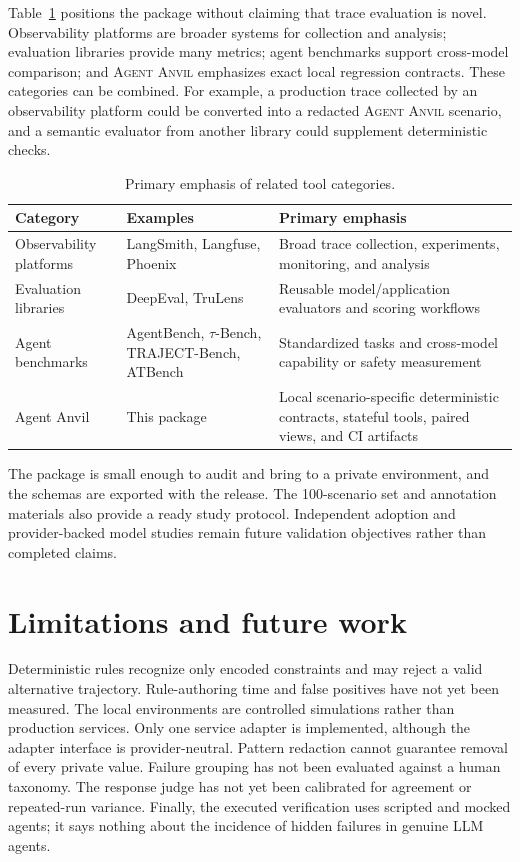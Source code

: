 \documentclass[preprint,12pt]{elsarticle}
\newcommand{\system}{\textsc{Agent Anvil}}
\begin{document}
Table~\ref{tab:positioning} positions the package without claiming that trace evaluation is novel. Observability platforms are broader systems for collection and analysis; evaluation libraries provide many metrics; agent benchmarks support cross-model comparison; and \system{} emphasizes exact local regression contracts. These categories can be combined. For example, a production trace collected by an observability platform could be converted into a redacted \system{} scenario, and a semantic evaluator from another library could supplement deterministic checks.

\begin{table}[ht]
\centering
\caption{Primary emphasis of related tool categories.}
\label{tab:positioning}
\small
\begin{tabular}{@{}p{}p{}p{}@{}}
\toprule
\textbf{Category} & \textbf{Examples} & \textbf{Primary emphasis} \\
\midrule
Observability platforms & LangSmith, Langfuse, Phoenix & Broad trace collection, experiments, monitoring, and analysis \\
Evaluation libraries & DeepEval, TruLens & Reusable model/application evaluators and scoring workflows \\
Agent benchmarks & AgentBench, $\tau$-Bench, TRAJECT-Bench, ATBench & Standardized tasks and cross-model capability or safety measurement \\
Agent Anvil & This package & Local scenario-specific deterministic contracts, stateful tools, paired views, and CI artifacts \\
\bottomrule
\end{tabular}
\end{table}

The package is small enough to audit and bring to a private environment, and the schemas are exported with the release. The 100-scenario set and annotation materials also provide a ready study protocol. Independent adoption and provider-backed model studies remain future validation objectives rather than completed claims.

\section{Limitations and future work}

Deterministic rules recognize only encoded constraints and may reject a valid alternative trajectory. Rule-authoring time and false positives have not yet been measured. The local environments are controlled simulations rather than production services. Only one service adapter is implemented, although the adapter interface is provider-neutral. Pattern redaction cannot guarantee removal of every private value. Failure grouping has not been evaluated against a human taxonomy. The response judge has not yet been calibrated for agreement or repeated-run variance. Finally, the executed verification uses scripted and mocked agents; it says nothing about the incidence of hidden failures in genuine LLM agents.
\end{document}
